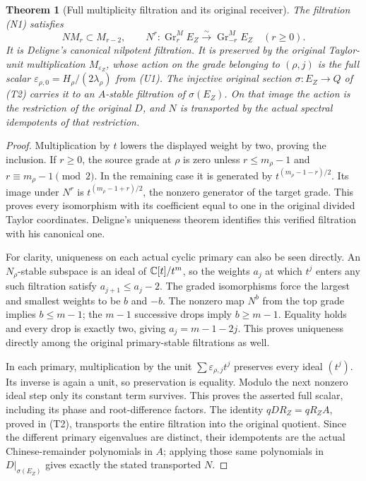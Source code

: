 \documentclass[11pt]{article}
\newtheorem{theorem}{Theorem}[section]
\begin{document}
\begin{theorem}[Full multiplicity filtration and its original receiver]
The filtration (N1) satisfies
\[
 NM_r\subset M_{r-2},\qquad
 N^r:\operatorname{Gr}_r^M E_Z\xrightarrow{\sim}
             \operatorname{Gr}_{-r}^M E_Z\quad(r\geq0).
 \tag{N2}
\]
It is Deligne's canonical nilpotent filtration. It is preserved by the
original Taylor-unit multiplication $M_{\varepsilon_Z}$, whose action on
the grade belonging to $(\rho,j)$ is the full scalar
$\varepsilon_{\rho,0}=H_\rho/(2\lambda_\rho)$ from (U1).
The injective original section $\sigma:E_Z\to Q$ of (T2) carries it to
an $A$-stable filtration of $\sigma(E_Z)$. On that image the action is
the restriction of the original $D$, and $N$ is transported by the
actual spectral idempotents of that restriction.
\end{theorem}
\begin{proof}
Multiplication by $t$ lowers the displayed weight by two, proving the
inclusion. If $r\geq0$, the source grade at $\rho$ is zero unless
$r\leq m_\rho-1$ and $r\equiv m_\rho-1\pmod2$. In the remaining
case it is generated by $t^{(m_\rho-1-r)/2}$. Its image under $N^r$
is $t^{(m_\rho-1+r)/2}$, the nonzero generator of the target grade.
This proves every isomorphism with its coefficient equal to one in
the original divided Taylor coordinates. Deligne's uniqueness theorem
identifies this verified filtration with his canonical one.

For clarity, uniqueness on each actual cyclic primary can also be seen
directly. An $N_\rho$-stable subspace is an ideal of $\mathbb C[t]/t^m$,
so the weights $a_j$ at which $t^j$ enters any such filtration satisfy
$a_{j+1}\leq a_j-2$. The graded isomorphisms force the largest and
smallest weights to be $b$ and $-b$. The nonzero map $N^b$ from the
top grade implies $b\leq m-1$; the $m-1$ successive drops imply
$b\geq m-1$. Equality holds and every drop is exactly two, giving
$a_j=m-1-2j$. This proves uniqueness directly among the original
primary-stable filtrations as well.

In each primary, multiplication by the unit
$\sum\varepsilon_{\rho,j}t^j$ preserves every ideal $(t^j)$.
Its inverse is again a unit, so preservation is equality. Modulo the
next nonzero ideal step only its constant term survives. This proves
the asserted full scalar, including its phase and root-difference
factors. The identity $qDR_Z=qR_ZA$, proved in (T2), transports the
entire filtration into the original quotient. Since the different
primary eigenvalues are distinct, their idempotents are the actual
Chinese-remainder polynomials in $A$; applying those same polynomials
in $D|_{\sigma(E_Z)}$ gives exactly the stated transported $N$.
\end{proof}
\end{document}
